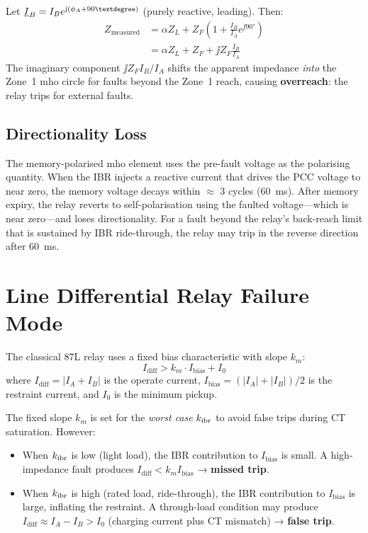 Let $\phasor{I}_B = I_B e^{\jj(\phi_A + 90°)}$ (purely reactive, leading).
Then:
\begin{align}
  Z_\mathrm{measured} &= \alpha Z_L + Z_F\left(1 + \frac{I_B}{I_A}e^{\jj 90°}\right)
  \nonumber \\
  &= \alpha Z_L + Z_F + \jj Z_F \frac{I_B}{I_A}
  \label{eq:ch3_reactive_overreach}
\end{align}
The imaginary component $\jj Z_F I_B/I_A$ shifts the apparent impedance
\emph{into} the Zone~1 mho circle for faults beyond the Zone~1 reach,
causing \textbf{overreach}: the relay trips for external faults.

\subsection{Directionality Loss}

The memory-polarised mho element uses the pre-fault voltage as the
polarising quantity. When the IBR injects a reactive current that drives
the PCC voltage to near zero, the memory voltage decays within $\approx$
3 cycles (60~ms). After memory expiry, the relay reverts to self-polarisation
using the faulted voltage—which is near zero—and loses directionality.
For a fault beyond the relay's back-reach limit that is sustained by IBR
ride-through, the relay may trip in the reverse direction after 60~ms.

\section{Line Differential Relay Failure Mode}
\label{sec:ch3_87l}

The classical 87L relay uses a fixed bias characteristic with slope $k_m$:
\begin{equation}
  I_\mathrm{diff} > k_m \cdot I_\mathrm{bias} + I_0
  \label{eq:ch3_87l_fixed}
\end{equation}
where $I_\mathrm{diff} = |I_A + I_B|$ is the operate current,
$I_\mathrm{bias} = (|I_A| + |I_B|)/2$ is the restraint current, and
$I_0$ is the minimum pickup.

The fixed slope $k_m$ is set for the \emph{worst case} $k_{\mathrm{ibr}}$ to avoid
false trips during CT saturation. However:

\begin{itemize}
\item When $k_{\mathrm{ibr}}$ is low (light load), the IBR contribution to $I_\mathrm{bias}$
      is small. A high-impedance fault produces $I_\mathrm{diff} < k_m I_\mathrm{bias}$
      → \textbf{missed trip}.

\item When $k_{\mathrm{ibr}}$ is high (rated load, ride-through), the IBR contribution
      to $I_\mathrm{bias}$ is large, inflating the restraint. A through-load
      condition may produce $I_\mathrm{diff} \approx I_A - I_B > I_0$
      (charging current plus CT mismatch) → \textbf{false trip}.
\end{itemize}

